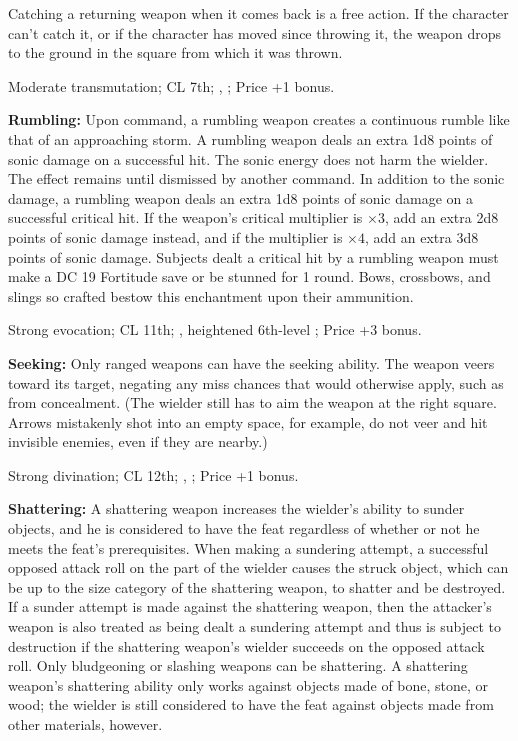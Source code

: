 Catching a returning weapon when it comes back is a free action. If the character can't catch it, or if the character has moved since throwing it, the weapon drops to the ground in the square from which it was thrown.

Moderate transmutation; CL 7th; , ; Price +1 bonus.

\textbf{Rumbling:} Upon command, a rumbling weapon creates a continuous rumble like that of an approaching storm. A rumbling weapon deals an extra 1d8 points of sonic damage on a successful hit. The sonic energy does not harm the wielder. The effect remains until dismissed by another command. In addition to the sonic damage, a rumbling weapon deals an extra 1d8 points of sonic damage on a successful critical hit. If the weapon's critical multiplier is $\times3$, add an extra 2d8 points of sonic damage instead, and if the multiplier is $\times4$, add an extra 3d8 points of sonic damage. Subjects dealt a critical hit by a rumbling weapon must make a DC 19 Fortitude save or be stunned for 1 round. Bows, crossbows, and slings so crafted bestow this enchantment upon their ammunition.

Strong evocation; CL 11th; , heightened 6th-level ; Price +3 bonus.

\textbf{Seeking:} Only ranged weapons can have the seeking ability. The weapon veers toward its target, negating any miss chances that would otherwise apply, such as from concealment. (The wielder still has to aim the weapon at the right square. Arrows mistakenly shot into an empty space, for example, do not veer and hit invisible enemies, even if they are nearby.)

Strong divination; CL 12th; , ; Price +1 bonus.

\textbf{Shattering:} A shattering weapon increases the wielder's ability to sunder objects, and he is considered to have the  feat regardless of whether or not he meets the feat's prerequisites. When making a sundering attempt, a successful opposed attack roll on the part of the wielder causes the struck object, which can be up to the size category of the shattering weapon, to shatter and be destroyed. If a sunder attempt is made against the shattering weapon, then the attacker's weapon is also treated as being dealt a sundering attempt and thus is subject to destruction if the shattering weapon's wielder  succeeds on the opposed attack roll. Only bludgeoning or slashing weapons can be shattering. A shattering weapon's shattering ability only works against objects made of bone, stone, or wood; the wielder is still considered to have the  feat against objects made from other materials, however.

